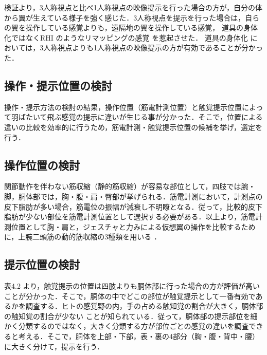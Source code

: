 \begin{small}
      検証より，3人称視点と比べ1人称視点の映像提示を行った場合の方が，自分の体から翼が生えている様子を強く感じた．3人称視点を提示を行った場合は，自らの翼を操作している感覚よりも，遠隔地の翼を操作している感覚，
      道具の身体化ではなくRHI
      のようなリマッピングの感覚
      を惹起させた．
      道具の身体化
      においては，3人称視点よりも1人称視点の映像提示の方が有効であることが分かった．
  
  \subsection{操作・提示位置の検討}
    操作・提示方法の検討の結果，操作位置（筋電計測位置）と触覚提示位置によって羽ばたいて飛ぶ感覚の提示に違いが生じる事が分かった．そこで，位置による違いの比較を効率的に行うため，筋電計測・触覚提示位置の候補を挙げ，選定を行う．
  
    \subsection{操作位置の検討} %
      関節動作を伴わない筋収縮（静的筋収縮）が容易な部位として，四肢では腕・脚，胴体部では，胸・腹・肩・臀部が挙げられる．筋電計測において，計測点の皮下脂肪が多い場合，筋電位の振幅が減衰し不明瞭となる\cite{白石恵1992筋電位多点計測による体幹背部の神経支配帯の分布}．従って，比較的皮下脂肪が少ない部位を筋電計測位置として選択する必要がある．以上より，筋電計測位置として胸・肩と，ジェスチャと力みによる仮想翼の操作を比較するために，上腕二頭筋の動的筋収縮の3種類を用いる
      ．

    \subsection{提示位置の検討} %
      表4.2
      より，触覚提示の位置は四肢よりも胴体部に行った場合の方が評価が高いことが分かった．そこで，胴体の中でどこの部位が触覚提示として一番有効であるかを調査する．ヒトの感覚野の内，手の占める触知覚の割合が大きく\cite{penfield1950cerebral}，胴体部の触知覚の割合が少ない
      ことが知られている．従って，胴体部の提示部位を細かく分類するのではなく，大きく分類する方が部位ごとの感覚の違いを調査できると考える．そこで，胴体を上部・下部，表・裏の4部分（胸・腹・背中・腰）に大きく分けて，提示を行う．        



\end{small}
